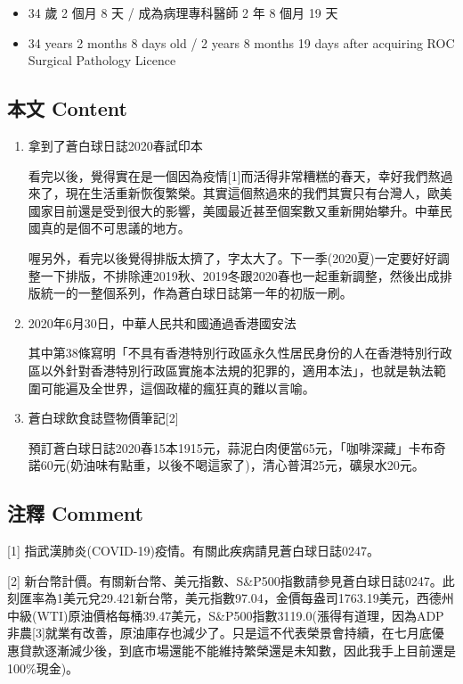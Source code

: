 \documentclass[a5paper, 11pt
]{book}
\providecommand{\tightlist}{%
  \setlength{\itemsep}{0pt}\setlength{\parskip}{0pt}}
\begin{document}
\begin{itemize}
\tightlist
\item
  34 歲 2 個月 8 天 / 成為病理專科醫師 2 年 8 個月 19 天
\item
  34 years 2 months 8 days old / 2 years 8 months 19 days after
  acquiring ROC Surgical Pathology Licence
\end{itemize}

\hypertarget{ux672cux6587-content-30}{%
\subsection{本文 Content}\label{ux672cux6587-content-30}}

\begin{enumerate}
\def\labelenumi{\arabic{enumi}.}
\item
  拿到了蒼白球日誌2020春試印本

  看完以後，覺得實在是一個因為疫情{[}1{]}而活得非常糟糕的春天，幸好我們熬過來了，現在生活重新恢復繁榮。其實這個熬過來的我們其實只有台灣人，歐美國家目前還是受到很大的影響，美國最近甚至個案數又重新開始攀升。中華民國真的是個不可思議的地方。

  喔另外，看完以後覺得排版太擠了，字太大了。下一季(2020夏)一定要好好調整一下排版，不排除連2019秋、2019冬跟2020春也一起重新調整，然後出成排版統一的一整個系列，作為蒼白球日誌第一年的初版一刷。
\item
  2020年6月30日，中華人民共和國通過香港國安法

  其中第38條寫明「不具有香港特別行政區永久性居民身份的人在香港特別行政區以外針對香港特別行政區實施本法規的犯罪的，適用本法」，也就是執法範圍可能遍及全世界，這個政權的瘋狂真的難以言喻。
\item
  蒼白球飲食誌暨物價筆記{[}2{]}

  預訂蒼白球日誌2020春15本1915元，蒜泥白肉便當65元，「咖啡深藏」卡布奇諾60元(奶油味有點重，以後不喝這家了)，清心普洱25元，礦泉水20元。
\end{enumerate}

\hypertarget{ux6ce8ux91cb-comment-30}{%
\subsection{注釋 Comment}\label{ux6ce8ux91cb-comment-30}}

{[}1{]} 指武漢肺炎(COVID-19)疫情。有關此疾病請見蒼白球日誌0247。

{[}2{]}
新台幣計價。有關新台幣、美元指數、S\&P500指數請參見蒼白球日誌0247。此刻匯率為1美元兌29.421新台幣，美元指數97.04，金價每盎司1763.19美元，西德州中級(WTI)原油價格每桶39.47美元，S\&P500指數3119.0(漲得有道理，因為ADP非農{[}3{]}就業有改善，原油庫存也減少了。只是這不代表榮景會持續，在七月底優惠貸款逐漸減少後，到底市場還能不能維持繁榮還是未知數，因此我手上目前還是100\%現金)。
\end{document}
